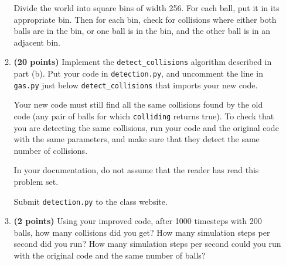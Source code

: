 \documentclass[12pt,twoside]{article}
\begin{document}
\begin{enumerate}
\begin{enumerate}
    Divide the world into square bins of width 256. For each ball, put
    it in its appropriate bin. Then for each bin, check for collisions
    where either both balls are in the bin, or one ball is in the bin,
    and the other ball is in an adjacent bin.
    
    \item {\bf (20 points)} Implement the \texttt{detect\_collisions}
    algorithm described in part (b). Put your code in
    \texttt{detection.py}, and uncomment the line in \texttt{gas.py}
    just below \texttt{detect\_collisions} that imports your new code.

    Your new code must still find all the same collisions found by the
    old code (any pair of balls for which \texttt{colliding} returns
    true). To check that you are detecting the same collisions, run
    your code and the original code with the same parameters, and make
    sure that they detect the same number of collisions.

    In your documentation, do not assume that the reader has read this
    problem set.

    Submit \texttt{detection.py} to the class website.

    \item {\bf (2 points)} Using your improved code, after 1000
    timesteps with 200 balls, how many collisions did you get? How
    many simulation steps per second did you run? How many simulation
    steps per second could you run with the original code and the same
    number of balls?

  \end{enumerate}

\end{enumerate}
\end{document}

